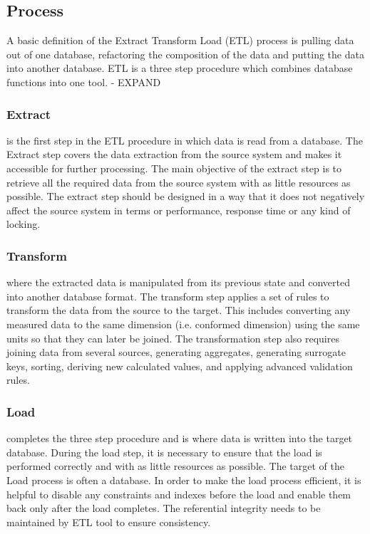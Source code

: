 \subsection{Process}
A basic definition of the Extract Transform Load (ETL) process is pulling data out of one database, refactoring the composition of the data and putting the data into another database. ETL is a three step procedure which combines database functions into one tool. - EXPAND

\subsubsection{Extract}\label{extract} is the first step in the ETL procedure in which data is read from a database. The Extract step covers the data extraction from the source system and makes it accessible for further processing. The main objective of the extract step is to retrieve all the required data from the source system with as little resources as possible. The extract step should be designed in a way that it does not negatively affect the source system in terms or performance, response time or any kind of locking.

\subsubsection{Transform}\label{transform} where the extracted data is manipulated from its previous state and converted into another database format. The transform step applies a set of rules to transform the data from the source to the target. This includes converting any measured data to the same dimension (i.e. conformed dimension) using the same units so that they can later be joined. The transformation step also requires joining data from several sources, generating aggregates, generating surrogate keys, sorting, deriving new calculated values, and applying advanced validation rules.

\subsubsection{Load}\label{load} completes the three step procedure and is where data is written into the target database. During the load step, it is necessary to ensure that the load is performed correctly and with as little resources as possible. The target of the Load process is often a database. In order to make the load process efficient, it is helpful to disable any constraints and indexes before the load and enable them back only after the load completes. The referential integrity needs to be maintained by ETL tool to ensure consistency.

